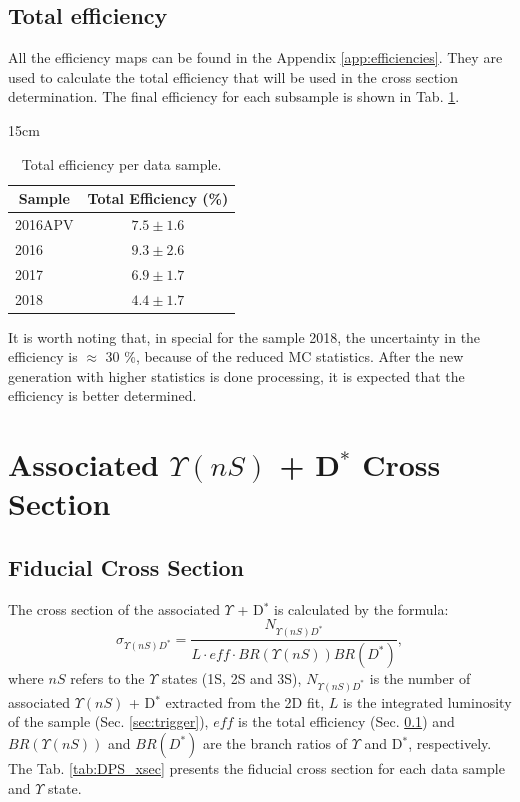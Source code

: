\subsection{Total efficiency}\label{sec:total_eff}

All the efficiency maps can be found in the Appendix \ref{app:efficiencies}. They are used to calculate the total efficiency that will be used in the cross section determination. The final efficiency for each subsample is shown in Tab. \ref{tab:totaleff}.

\begin{table}[!htbp]{15cm}
  \caption{Total efficiency per data sample.}
  \begin{tabular}{ l | c }
    \hline
    \multicolumn{1}{c|}{Sample} & \multicolumn{1}{c}{Total Efficiency (\%)} \\ \hline
    2016APV                     & $7.5 \pm 1.6$                       \\ \hline
    2016                        & $9.3 \pm 2.6$                       \\ \hline
    2017                        & $6.9 \pm 1.7$                       \\ \hline
    2018                        & $4.4 \pm 1.7$                       \\ \hline
  \end{tabular}
  \label{tab:totaleff}
\end{table}

It is worth noting that, in special for the sample 2018, the uncertainty in the efficiency is $\approx$ 30 \%, because of the reduced MC statistics. After the new generation with higher statistics is done processing, it is expected that the efficiency is better determined.

\section{Associated \texorpdfstring{$\Upsilon(nS)$ + D$^{*}$}{Y+D*} Cross Section}

\subsection{Fiducial Cross Section} \label{subsec:fiducial_xsec}

The cross section of the associated $\Upsilon$ + D$^{*}$ is calculated by the formula:
\begin{equation}
  \sigma_{\Upsilon(nS) D^*} = \frac{N_{\Upsilon(nS) D^*}}{L\cdot eff \cdot BR(\Upsilon(nS))BR(D^*)},
\end{equation}
where $nS$ refers to the $\Upsilon$ states (1S, 2S and 3S), $N_{\Upsilon(nS) D^*}$ is the number of associated $\Upsilon(nS)$ + D$^*$ extracted from the 2D fit, $L$ is the integrated luminosity of the sample (Sec. \ref{sec:trigger}), $eff$ is the total efficiency (Sec. \ref{sec:total_eff}) and $BR(\Upsilon(nS))$ and $BR(D^*)$ are the branch ratios of $\Upsilon$ and D$^*$, respectively. The Tab. \ref{tab:DPS_xsec} presents the fiducial cross section for each data sample and $\Upsilon$ state.

